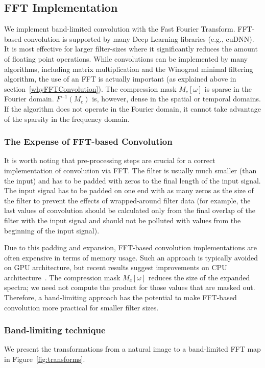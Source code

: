 \subsection{FFT Implementation}
We implement band-limited convolution with the Fast Fourier Transform. %
FFT-based convolution is supported by many Deep Learning libraries (e.g., cuDNN).
It is most effective for larger filter-sizes where it significantly reduces the amount of floating point operations. While convolutions can be implemented by many algorithms, including matrix multiplication  and the Winograd minimal filtering algorithm, the use of an FFT is actually important (as explained above in section~\ref{whyFFTConvolution}).
The compression mask $M_c[\omega]$ is sparse in the Fourier domain.
$F^{-1}(M_c)$ is, however, dense in the spatial or temporal domains. %
If the algorithm does not operate in the Fourier domain, it cannot take advantage of the sparsity in the frequency domain.

\subsubsection{The Expense of FFT-based Convolution}
It is worth noting that pre-processing steps are crucial for a correct implementation of convolution via FFT. The filter is usually much smaller (than the input) and has to be padded with zeros to the final length of the input signal. The input signal has to be padded on one end with as many zeros as the size of the filter to prevent the effects of wrapped-around filter data (for example, the last values of convolution should be calculated only from the final overlap of the filter with the input signal and should not be polluted with values from the beginning of the input signal). 

Due to this padding and expansion, FFT-based convolution implementations are often expensive in terms of memory usage.  Such an approach is typically avoided on GPU architecture, but recent results suggest improvements on CPU architecture~\cite{aleks2018fft}. 
The compression mask $M_c[\omega]$ reduces the size of the expanded spectra; we need not compute the product for those values that are masked out. Therefore, 
a band-limiting approach has the potential to make FFT-based convolution more practical for smaller filter sizes.

\subsubsection{Band-limiting technique}
We present the transformations from a natural image to a band-limited FFT map in Figure~\ref{fig:transforms}.

